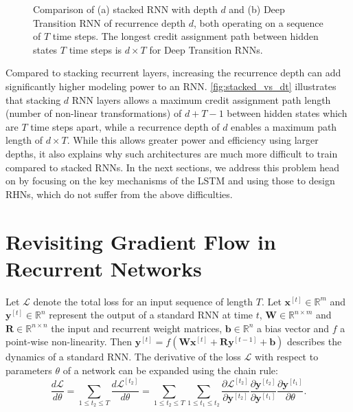 \documentclass[letterpaper]{article}
\newcommand{\ts}[1]{^{[#1]}}
\def\Rmat{\mathbf{R}}
\def\Wmat{\mathbf{W}}
\def\xvec{\mathbf{x}}
\def\yvec{\mathbf{y}}
\def\srnn{standard RNN}
\begin{document}
\begin{figure}[t]
\centering
\caption{Comparison of (a) stacked RNN with depth $d$ and (b) Deep Transition RNN of recurrence depth $d$, both operating on a sequence of $T$ time steps. The longest credit assignment path between hidden states $T$ time steps is $d\times T$ for Deep Transition RNNs.}
\label{fig:stacked_vs_dt}
\vspace{-5mm}
\end{figure}

Compared to stacking recurrent layers, increasing the recurrence depth can add significantly higher modeling power to an RNN.
\autoref{fig:stacked_vs_dt} illustrates that stacking $d$ RNN layers allows a maximum credit assignment path length (number of non-linear transformations) of $d+T-1$ between hidden states which are $T$ time steps apart, while a recurrence depth of $d$ enables a maximum path length of $d \times T$.
While this allows greater power and efficiency using larger depths, it also explains why such architectures are much more difficult to train compared to stacked RNNs.
In the next sections, we address this problem head on by focusing on the key mechanisms of the LSTM and using those to design RHNs, which do not suffer from the above difficulties.

\section{Revisiting Gradient Flow in Recurrent Networks}
Let $\mathcal{L}$ denote the total loss for an input sequence of length $T$.
Let $\xvec\ts{t} \in \mathbb{R}^m$ and $\yvec\ts{t} \in \mathbb{R}^n$ represent the output of a \srnn{} at time $t$, $\Wmat \in \mathbb{R}^{n \times m}$ and $\Rmat \in \mathbb{R}^{n \times n}$ the input and recurrent weight matrices, $\mathbf{b} \in \mathbb{R}^n$ a bias vector and $f$ a point-wise non-linearity. 
Then $\yvec\ts{t} = f(\Wmat\xvec\ts{t}+\Rmat\yvec\ts{t-1} + \mathbf{b})$ describes the dynamics of a \srnn{}.
The derivative of the loss $\mathcal{L}$ with respect to parameters $\theta$ of a network can be expanded using the chain rule:
\begin{equation}
\frac{d\mathcal{L}}{d\theta} = \sum_{1\leq t_2 \leq T} \frac{d\mathcal{L}\ts{t_2}}{d\theta} = \sum_{1\leq t_2 \leq T} \sum_{1\leq t_1 \leq t_2} \frac{\partial\mathcal{L}\ts{t_2}}{\partial\yvec\ts{t_2}} \frac{\partial \yvec\ts{t_2}}{\partial \yvec\ts{t_1}}\frac{\partial \yvec\ts{t_1}}{\partial \theta}.
\end{equation}
\end{document}

